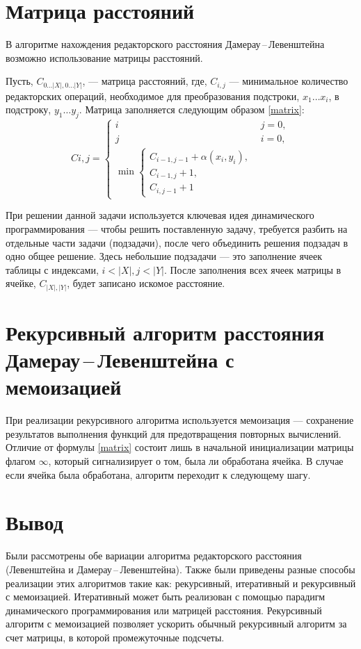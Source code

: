 \section{Матрица расстояний}
В алгоритме нахождения редакторского расстояния Дамерау\,--\,Левенштейна возможно использование матрицы расстояний.

Пусть, $C_{0 \dots |X|, 0 \dots |Y|}$, --- матрица расстояний, где, $C_{i, j}$ --- минимальное количество редакторских операций, необходимое для преобразования подстроки, $x_1\dots x_i$, в подстроку, $y_1 \dots y_j$. Матрица заполняется следующим образом \ref{matrix}:
\begin{equation}\label{matrix}
	C{i, j} = 
	\begin{cases}
		i & j = 0, \\
		j & i = 0, \\
		\min 
		\begin{cases}
			C_{i - 1, j - 1} + \alpha(x_i, y_i), \\
			C_{i - 1, j} + 1, \\
			C_{i, j - 1} + 1
		\end{cases}
	\end{cases}
\end{equation}

При решении данной задачи используется ключевая идея динамического программирования --- чтобы решить поставленную задачу, требуется разбить на отдельные части задачи (подзадачи), после чего объединить решения подзадач в одно общее решение. Здесь небольшие подзадачи --- это заполнение ячеек таблицы с индексами, $i < |X|, j < |Y|$. После заполнения всех ячеек матрицы в ячейке, $C_{|X|, |Y|}$, будет записано искомое расстояние.



\section{Рекурсивный алгоритм расстояния Дамерау\,--\,Левенштейна с мемоизацией}
При реализации рекурсивного алгоритма используется мемоизация --- сохранение результатов выполнения функций для предотвращения повторных вычислений. Отличие от формулы \ref{matrix} состоит лишь в начальной инициализации матрицы флагом $\infty$, который сигнализирует о том, была ли обработана ячейка. В случае если ячейка была обработана, алгоритм переходит к следующему шагу. 


\section{Вывод}
Были рассмотрены обе вариации алгоритма редакторского расстояния (Левенштейна и Дамерау\,--\,Левенштейна). Также были приведены разные способы реализации этих алгоритмов такие как: рекурсивный, итеративный и рекурсивный с мемоизацией. Итеративный может быть реализован с помощью парадигм динамического программирования или матрицей расстояния. Рекурсивный алгоритм с мемоизацией позволяет ускорить обычный рекурсивный алгоритм за счет матрицы, в которой промежуточные подсчеты.